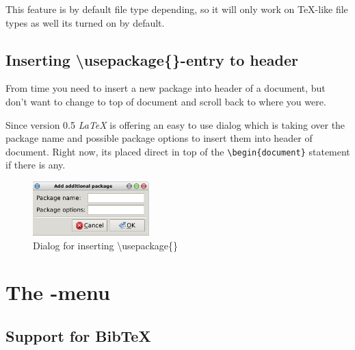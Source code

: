 \documentclass[%
paper=a4,%
fontsize=11pt,%
twoside=false,%
DIV18,%
headsepline,%
plainheadsepline,%
footsepline,%
plainfootsepline,%
bibliography=totoc,%
listof=totoc,%
BCOR10mm,%
parskip=half,%
openany,%
]{scrreprt}
\begin{document}
This feature is by default file type depending, so it will only work
on \TeX{}-like file types as well its turned on by default.


\subsection{Inserting \textbackslash{}usepackage\{\}-entry to header}

From time you need to insert a new package into header of a document,
but don't want to change to top of document and scroll back to where you were.

Since version 0.5 \textit{LaTeX} is offering an easy to use dialog
which is taking over the package name and possible package options to
insert them into header of document. Right now, its placed direct in
top of the \texttt{\textbackslash{}begin\{document\}} statement if
there is any.

\begin{figure}[ht]
    \centering
    \includegraphics[width=0.4\textwidth]{img/insert_usepackage.png}
    \caption{Dialog for inserting \textbackslash{}usepackage\{\}}
\end{figure}


\section{The -menu}
\subsection{Support for BibTeX}
\end{document}
